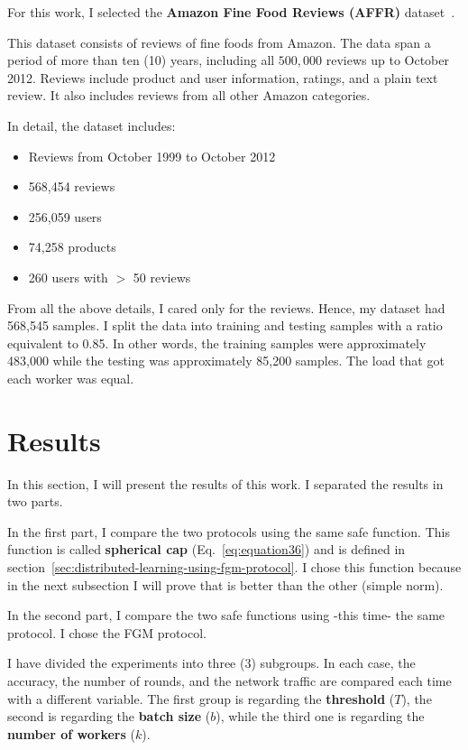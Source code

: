 For this work, I selected the \textbf{Amazon Fine Food Reviews (AFFR)} dataset~\cite{amazon_dataset}.

This dataset consists of reviews of fine foods from Amazon.
The data span a period of more than ten (10) years, including all $500,000$ reviews up to October 2012.
Reviews include product and user information, ratings, and a plain text review.
It also includes reviews from all other Amazon categories.

In detail, the dataset includes:

\begin{itemize}
    \item Reviews from October 1999 to October 2012
    \item 568,454 reviews
    \item 256,059 users
    \item 74,258 products
    \item 260 users with $>$ 50 reviews

\end{itemize}

From all the above details, I cared only for the reviews.
Hence, my dataset had 568,545 samples.
I split the data into training and testing samples with a ratio equivalent to 0.85.
In other words, the training samples were approximately 483,000 while the testing was approximately 85,200 samples.
The load that got each worker was equal.

\newpage

\section{Results}\label{sec:results}

In this section, I will present the results of this work.
I separated the results in two parts.

In the first part, I compare the two protocols using the same safe function.
This function is called \textbf{spherical cap} (Eq.~\ref{eq:equation36}) and is defined in section~\ref{sec:distributed-learning-using-fgm-protocol}.
I chose this function because in the next subsection I will prove that is better than the other (simple norm).

In the second part, I compare the two safe functions using -this time- the same protocol.
I chose the FGM protocol.

I have divided the experiments into three (3) subgroups.
In each case, the accuracy, the number of rounds, and the network traffic are compared each time with a different variable.
The first group is regarding the \textbf{threshold} ($T$), the second is regarding the \textbf{batch size} ($b$),
while the third one is regarding the \textbf{number of workers} ($k$).

